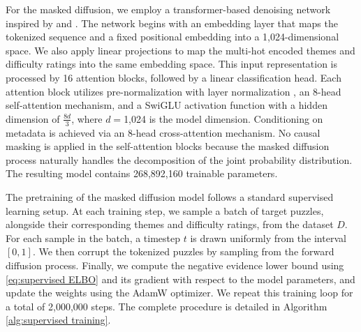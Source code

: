 For the masked diffusion, we employ a transformer-based denoising network inspired by \citeauthor{ruoss2024amortizedplanninglargescaletransformers} \cite{ruoss2024amortizedplanninglargescaletransformers} and \citeauthor{feng2025generatingcreativechesspuzzles} \cite{feng2025generatingcreativechesspuzzles}. The network begins with an embedding layer that maps the tokenized sequence and a fixed positional embedding into a 1,024-dimensional space. We also apply linear projections to map the multi-hot encoded themes and difficulty ratings into the same embedding space. This input representation is processed by 16 attention blocks, followed by a linear classification head. Each attention block utilizes pre-normalization with layer normalization \cite{touvron2023llamaopenefficientfoundation, touvron2023llama2openfoundation}, an 8-head self-attention mechanism, and a SwiGLU activation function \cite{shazeer2020gluvariantsimprovetransformer, touvron2023llamaopenefficientfoundation, touvron2023llama2openfoundation} with a hidden dimension of $\frac{8d}{3}$, where $d = $1,024 is the model dimension. Conditioning on metadata is achieved via an 8-head cross-attention mechanism. No causal masking is applied in the self-attention blocks because the masked diffusion process naturally handles the decomposition of the joint probability distribution. The resulting model contains 268,892,160 trainable parameters.

The pretraining of the masked diffusion model follows a standard supervised learning setup. At each training step, we sample a batch of target puzzles, alongside their corresponding themes and difficulty ratings, from the dataset $D$. For each sample in the batch, a timestep $t$ is drawn uniformly from the interval $[0, 1]$. We then corrupt the tokenized puzzles by sampling from the forward diffusion process. Finally, we compute the negative evidence lower bound using \eqref{eq:supervised ELBO} and its gradient with respect to the model parameters, and update the weights using the AdamW optimizer. We repeat this training loop for a total of 2,000,000 steps. The complete procedure is detailed in Algorithm \ref{alg:supervised training}.

